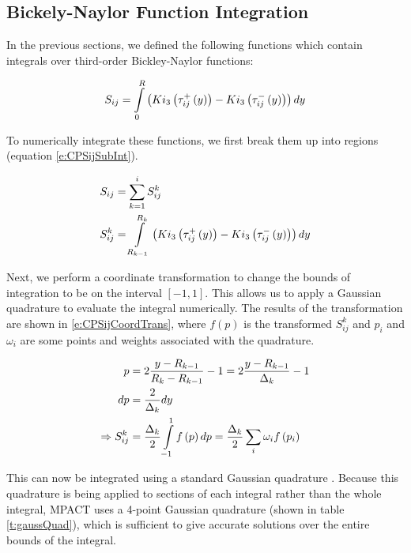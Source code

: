\subsection{Bickely-Naylor Function Integration}

In the previous sections, we defined the following functions which contain integrals over third-order Bickley-Naylor functions:

\begin{equation}\label{e:CPSijDef}
S_{ij} = \intop_0^{R} \left(Ki_3\left(\tau_{ij}^+\left(y\right)\right) - Ki_3\left(\tau_{ij}^-\left(y\right)\right)\right) dy
\end{equation}

To numerically integrate these functions, we first break them up into regions (equation \ref{e:CPSijSubInt}).

\begin{subequations}\label{e:CPSijSubInt}
  \begin{align}
  S_{ij} &= \sum_{k=1}^i S_{ij}^k \\
  S_{ij}^k &= \intop_{R_{k-1}}^{R_k} \left(Ki_3\left(\tau_{ij}^+\left(y\right)\right) - Ki_3\left(\tau_{ij}^-\left(y\right)\right)\right) dy
  \end{align}
\end{subequations}

Next, we perform a coordinate transformation to change the bounds of integration to be on the interval $\left[-1, 1\right]$.  This allows us to apply a Gaussian quadrature to evaluate the integral numerically.  The results of the transformation are shown in \ref{e:CPSijCoordTrans}, where $f\left(p\right)$ is the transformed $S_{ij}^k$ and $p_i$ and $\omega_i$ are some points and weights associated with the quadrature.

\begin{subequations}\label{e:CPSijCoordTrans}
  \begin{align}
  p &= 2\frac{y - R_{k-1}}{R_k - R_{k-1}} - 1 = 2\frac{y - R_{k-1}}{\Delta_k} -1 \\
  dp &= \frac{2}{\Delta_k}dy \\
  \Rightarrow S_{ij}^k &= \frac{\Delta_k}{2} \intop_{-1}^1 f\left(p\right)dp = \frac{\Delta_k}{2} \sum_i \omega_i f\left(p_i\right)
  \end{align}
\end{subequations}

This can now be integrated using a standard Gaussian quadrature \cite{HandbookOfMathFunctions1972}.  Because this quadrature is being applied to sections of each integral rather than the whole integral, MPACT uses a 4-point Gaussian quadrature (shown in table \ref{t:gaussQuad}), which is sufficient to give accurate solutions over the entire bounds of the integral.

